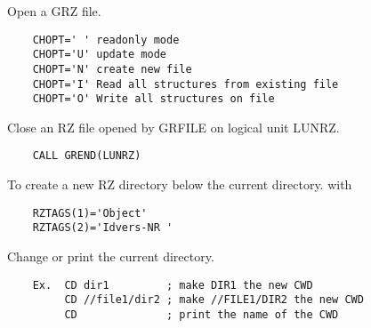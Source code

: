 
\BEGARG
{}
\ENDARG
{}
\DEFOPT{\EMPTY}{}
\ENDOPT

   \par
Open a GRZ file.  
\begin{verbatim}
    CHOPT=' ' readonly mode
    CHOPT='U' update mode
    CHOPT='N' create new file
    CHOPT='I' Read all structures from existing file
    CHOPT='O' Write all structures on file
\end{verbatim}

\ENDCMD


\BEGARG
{}
\ENDARG

   \par
Close an RZ file opened by GRFILE on logical unit LUNRZ.  
\begin{verbatim}
    CALL GREND(LUNRZ)
\end{verbatim}

\ENDCMD


\BEGARG
{}
\ENDARG

   \par
To create a new RZ directory below the current directory.  with 
\begin{verbatim}
    RZTAGS(1)='Object'
    RZTAGS(2)='Idvers-NR '
\end{verbatim}

\ENDCMD


\BEGARG
{}
\ENDARG

   \par
Change or print the current directory.  
\begin{verbatim}
    Ex.  CD dir1         ; make DIR1 the new CWD
         CD //file1/dir2 ; make //FILE1/DIR2 the new CWD
         CD              ; print the name of the CWD
\end{verbatim}

\ENDCMD


